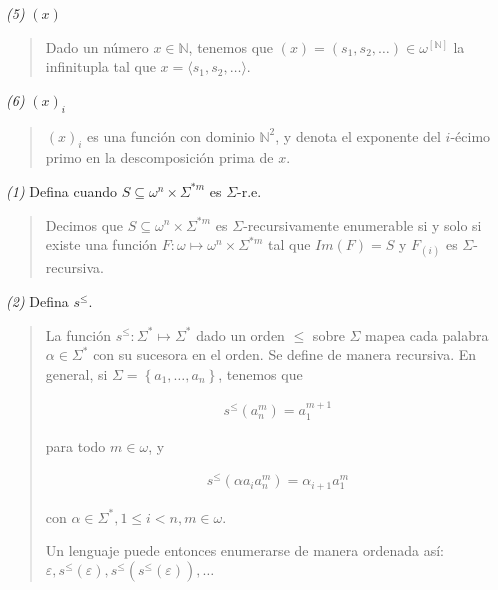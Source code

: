 \documentclass[a4paper, 12pt]{article}
\begin{document}
\textit{(5)} $(x)$


\small
\begin{quote}

Dado un número $x \in \mathbb{N}$, tenemos que $(x) = (s_1, s_2, \ldots) \in
\omega^{[\mathbb{N}]}$ la infinitupla tal que $x = \langle s_1, s_2, \ldots
\rangle $.

\end{quote}
\normalsize

\textit{(6)} $(x)_i$


\small
\begin{quote}

$(x)_i$ es una función con dominio $\mathbb{N}^2$, y denota el exponente del
$i$-écimo primo en la descomposición prima de $x$.

\end{quote}
\normalsize

\pagebreak 

\textit{(1)} Defina cuando $S \subseteq \omega^{n} \times \Sigma^{*m} $ es
$\Sigma$-r.e.


\small
\begin{quote}

Decimos que $S \subseteq \omega^{n} \times \Sigma^{*m} $ es
$\Sigma$-recursivamente enumerable si y solo si existe una función $F : \omega
\mapsto \omega^{n} \times \Sigma^{*m} $ tal que $Im(F) = S$ y $F_{(i)}$ es
$\Sigma$-recursiva.

\end{quote}
\normalsize

\textit{(2)} Defina $s^{\leq}$.


\small
\begin{quote}

    La función $s^{\leq} : \Sigma^{*} \mapsto \Sigma^{*}$ dado un orden $\leq$
    sobre $\Sigma$ mapea cada palabra $\alpha \in \Sigma^{*}$ con su sucesora en
    el orden. Se define de manera recursiva. En general, si $\Sigma = \left\{
    a_1, \ldots, a_n \right\} $, tenemos que 

    \begin{align*}
        s^{\leq}(a_n^{m}) = a_1^{m+1}
    \end{align*}

    para todo $m \in  \omega$, y 


    \begin{align*}
        s^{\leq}(\alpha a_i a_n^{m}) = \alpha_{i+1} a_1^m
    \end{align*}

    con $\alpha \in \Sigma^{*}, 1\leq i < n, m \in  \omega$.

    Un lenguaje puede entonces enumerarse de manera ordenada así: $\varepsilon,
    s^{\leq}(\varepsilon ), s^{\leq}(s ^{\leq}(\varepsilon )), \ldots$

\end{quote}
\normalsize
\end{document}
